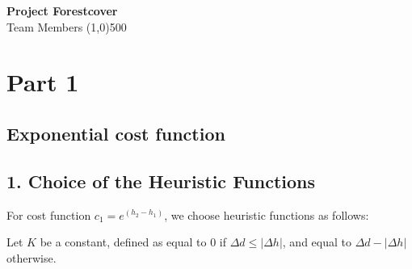 \documentclass[11pt]{article}  %
\begin{document}
\begin{center}
\textbf{Project Forestcover}\\

Team Members
\line(1,0){500}
\end{center}
\section*{Part 1}




\subsection*{Exponential cost function}

\subsection*{1. Choice of the Heuristic Functions}
For cost function $c_{1} = e^{(h_{2}-h_{1})}$, we choose heuristic functions as follows:

Let $K$ be a constant, defined as equal to $0$ if $\Delta d \le |\Delta h|$, and equal to $\Delta d - |\Delta h|$ otherwise.
\end{document}
